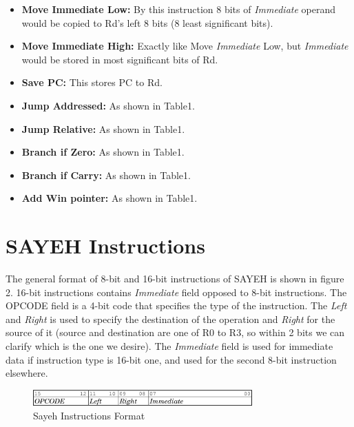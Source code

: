 \documentclass{report}
\begin{document}
\begin{itemize}
            \item \textbf{Move Immediate Low:}
                By this instruction 8 bits of \textit{Immediate} operand would be copied to Rd’s left 8 bits (8 least significant bits).
            \item \textbf{Move Immediate High:}
                Exactly like Move \textit{Immediate} Low, but \textit{Immediate} would be stored in most significant bits of Rd.
            \item \textbf{Save PC:} This stores PC to Rd. 
            \item \textbf{Jump Addressed:} As shown in Table1.
            \item \textbf{Jump Relative:} As shown in Table1.
            \item \textbf{Branch if Zero:} As shown in Table1.
            \item \textbf{Branch if Carry:} As shown in Table1.
            \item \textbf{Add Win pointer:} As shown in Table1.
        \end{itemize}
\section{SAYEH Instructions}
    The general format of 8-bit and 16-bit instructions of SAYEH is shown in figure 2. 16-bit 		instructions contains \textit{Immediate} field opposed to 8-bit instructions. The OPCODE field is 	a 4-bit code that specifies the type of the instruction. The \textit{Left} and \textit{Right} is used to 		specify the destination of the operation and \textit{Right} for the source of it (source and 		destination are one of R0 to R3, so within 2 bits we can clarify which is the one we 		desire). The \textit{Immediate} field is used for immediate data if instruction type is 16-bit one, and used for the second 8-bit instruction elsewhere.

    \begin{figure}[ht]
        \centering
        \includegraphics[width=0.75\textwidth]{figs/fig2}
        \caption{Sayeh Instructions Format}
    \end{figure}
\end{document}
